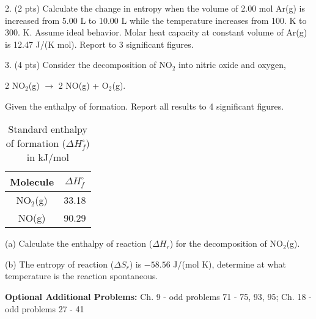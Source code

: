 \documentclass[11pt]{article}
\begin{document}
2. (2 pts) Calculate the change in entropy when the volume of 2.00 mol Ar(g) is increased
from 5.00 L to 10.00 L while the temperature increases from 100. K to 300. K. Assume
ideal behavior. Molar heat capacity at constant volume of Ar(g) is 12.47 J/(K mol).
Report to 3 significant figures.


\vspace{2in}

3. (4 pts) Consider the decomposition of NO$_2$ into nitric oxide and oxygen,
\begin{center}
  2 NO$_2$(g) $\rightarrow$ 2 NO(g) + O$_2$(g).
\end{center}
Given the enthalpy of formation. Report all results to 4 significant figures.

\begin{table}[hbpt]
  \caption{Standard enthalpy of formation ($\Delta H^\circ_f$)
    in kJ/mol}
  \centering
  \begin{tabular}{c|c}
    Molecule & $\Delta H^\circ_f$ \\
    \hline
    NO$_2$(g) & 33.18  \\
    NO(g)     & 90.29
  \end{tabular}
\end{table}

(a) Calculate the enthalpy of reaction ($\Delta H_r$) for the decomposition of NO$_2$(g).

(b) The entropy of reaction ($\Delta S_r$) is $-58.56$ J/(mol K), determine at what temperature
is the reaction spontaneous.


%
%
%
%
%
%
%


\vfill
\textbf{Optional Additional Problems:} Ch. 9 - odd problems 71 - 75, 93, 95; Ch. 18
- odd problems 27 - 41
\end{document}
